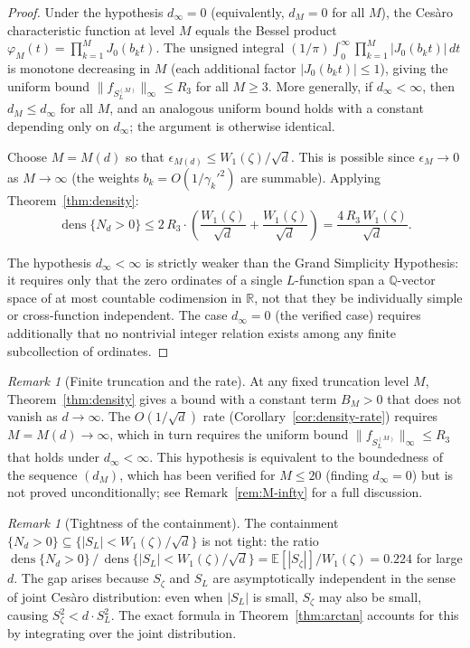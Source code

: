 \documentclass[12pt,reqno]{amsart}
\theoremstyle{plain}
\theoremstyle{definition}
\theoremstyle{remark}
\newtheorem{remark}[theorem]{Remark}
\DeclareMathOperator{\dens}{dens}
\newcommand{\Q}{\mathbb{Q}}
\newcommand{\R}{\mathbb{R}}
\newcommand{\E}{\mathbb{E}}
\begin{document}
\begin{proof}
Under the hypothesis $d_\infty = 0$ (equivalently, $d_M = 0$ for all $M$), the Ces\`aro characteristic function at level $M$ equals the Bessel product $\varphi_M(t) = \prod_{k=1}^M J_0(b_k t)$.  The unsigned integral $(1/\pi)\int_0^\infty \prod_{k=1}^M |J_0(b_k t)|\, dt$ is monotone decreasing in $M$ (each additional factor $|J_0(b_k t)| \leq 1$), giving the uniform bound $\|f_{S_L^{(M)}}\|_\infty \leq R_3$ for all $M \geq 3$.  More generally, if $d_\infty < \infty$, then $d_M \leq d_\infty$ for all $M$, and an analogous uniform bound holds with a constant depending only on $d_\infty$; the argument is otherwise identical.

Choose $M = M(d)$ so that $\epsilon_{M(d)} \leq W_1(\zeta)/\sqrt{d}$.  This is possible since $\epsilon_M \to 0$ as $M \to \infty$ (the weights $b_k = O(1/\gamma_k'^2)$ are summable).  Applying Theorem~\ref{thm:density}:
\[
  \dens\{N_d > 0\} \leq 2\,R_3 \cdot \left(\frac{W_1(\zeta)}{\sqrt{d}} + \frac{W_1(\zeta)}{\sqrt{d}}\right) = \frac{4\,R_3\, W_1(\zeta)}{\sqrt{d}}.
\]

The hypothesis $d_\infty < \infty$ is strictly weaker than the Grand Simplicity Hypothesis: it requires only that the zero ordinates of a single $L$-function span a $\Q$-vector space of at most countable codimension in $\R$, not that they be individually simple or cross-function independent.  The case $d_\infty = 0$ (the verified case) requires additionally that no nontrivial integer relation exists among any finite subcollection of ordinates.
\end{proof}

\begin{remark}[Finite truncation and the rate]\label{rem:finite-suffices}
At any fixed truncation level $M$, Theorem~\ref{thm:density} gives a bound with a constant term $B_M > 0$ that does not vanish as $d \to \infty$.  The $O(1/\sqrt{d})$ rate (Corollary~\ref{cor:density-rate}) requires $M = M(d) \to \infty$, which in turn requires the uniform bound $\|f_{S_L^{(M)}}\|_\infty \leq R_3$ that holds under $d_\infty < \infty$.  This hypothesis is equivalent to the boundedness of the sequence $(d_M)$, which has been verified for $M \leq 20$ (finding $d_\infty = 0$) but is not proved unconditionally; see Remark~\ref{rem:M-infty} for a full discussion.
\end{remark}

\begin{remark}[Tightness of the containment]\label{rem:tightness}
The containment $\{N_d > 0\} \subseteq \{|S_L| < W_1(\zeta)/\sqrt{d}\}$ is not tight: the ratio $\dens\{N_d > 0\}\,/\,\dens\{|S_L| < W_1(\zeta)/\sqrt{d}\} = \E[|S_\zeta|]/W_1(\zeta) = 0.224$ for large $d$.  The gap arises because $S_\zeta$ and $S_L$ are asymptotically independent in the sense of joint Ces\`aro distribution: even when $|S_L|$ is small, $S_\zeta$ may also be small, causing $S_\zeta^2 < d\cdot S_L^2$.  The exact formula in Theorem~\ref{thm:arctan} accounts for this by integrating over the joint distribution.
\end{remark}
\end{document}
